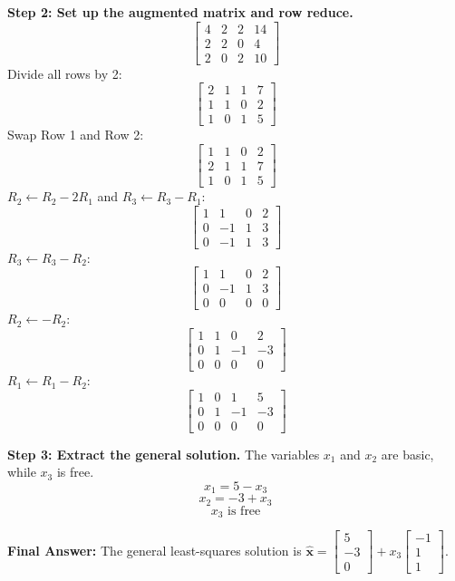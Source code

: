 \documentclass[11pt, letterpaper]{article}
\theoremstyle{definition}
\theoremstyle{remark}
\begin{document}
\textbf{Step 2: Set up the augmented matrix and row reduce.}
\[
\left[ \begin{array}{ccc|c} 4 & 2 & 2 & 14 \\ 2 & 2 & 0 & 4 \\ 2 & 0 & 2 & 10 \end{array} \right]
\]
Divide all rows by 2:
\[
\left[ \begin{array}{ccc|c} 2 & 1 & 1 & 7 \\ 1 & 1 & 0 & 2 \\ 1 & 0 & 1 & 5 \end{array} \right]
\]
Swap Row 1 and Row 2:
\[
\left[ \begin{array}{ccc|c} 1 & 1 & 0 & 2 \\ 2 & 1 & 1 & 7 \\ 1 & 0 & 1 & 5 \end{array} \right]
\]
$R_2 \leftarrow R_2 - 2R_1$ and $R_3 \leftarrow R_3 - R_1$:
\[
\left[ \begin{array}{ccc|c} 1 & 1 & 0 & 2 \\ 0 & -1 & 1 & 3 \\ 0 & -1 & 1 & 3 \end{array} \right]
\]
$R_3 \leftarrow R_3 - R_2$:
\[
\left[ \begin{array}{ccc|c} 1 & 1 & 0 & 2 \\ 0 & -1 & 1 & 3 \\ 0 & 0 & 0 & 0 \end{array} \right]
\]
$R_2 \leftarrow -R_2$:
\[
\left[ \begin{array}{ccc|c} 1 & 1 & 0 & 2 \\ 0 & 1 & -1 & -3 \\ 0 & 0 & 0 & 0 \end{array} \right]
\]
$R_1 \leftarrow R_1 - R_2$:
\[
\left[ \begin{array}{ccc|c} 1 & 0 & 1 & 5 \\ 0 & 1 & -1 & -3 \\ 0 & 0 & 0 & 0 \end{array} \right]
\]

\textbf{Step 3: Extract the general solution.}
The variables $x_1$ and $x_2$ are basic, while $x_3$ is free.
\[ x_1 = 5 - x_3 \]
\[ x_2 = -3 + x_3 \]
\[ x_3 \text{ is free} \]

\textbf{Final Answer:} The general least-squares solution is $\hat{\mathbf{x}} = \begin{bmatrix} 5 \\ -3 \\ 0 \end{bmatrix} + x_3 \begin{bmatrix} -1 \\ 1 \\ 1 \end{bmatrix}$.
\end{document}
